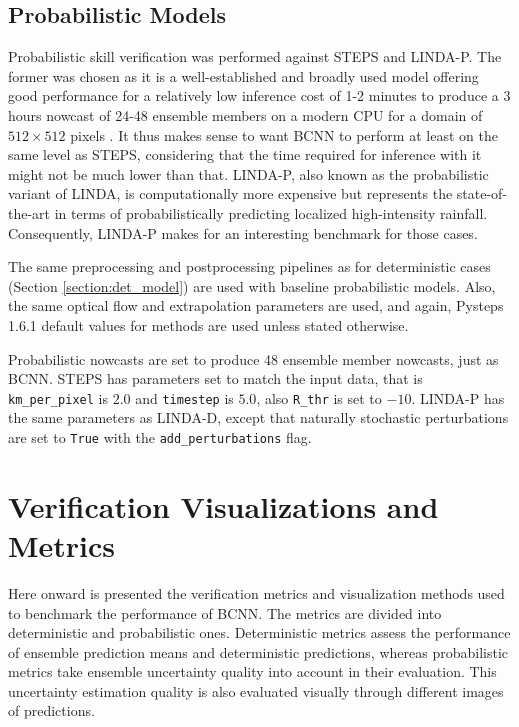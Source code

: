 \subsection{Probabilistic Models}
\label{section:prob_model}

Probabilistic skill verification was performed against STEPS and LINDA-P. The former was chosen as it is a well-established and broadly used model offering good performance for a relatively low inference cost of 1-2 minutes to produce a 3 hours nowcast of 24-48 ensemble members on a modern CPU for a domain of $512 \times 512$ pixels \cite{pulkkinen_pysteps_2019}. It thus makes sense to want BCNN to perform at least on the same level as STEPS, considering that the time required for inference with it might not be much lower than that. LINDA-P, also known as the probabilistic variant of LINDA, is computationally more expensive but represents the state-of-the-art in terms of probabilistically predicting localized high-intensity rainfall. Consequently, LINDA-P makes for an interesting benchmark for those cases. 

The same preprocessing and postprocessing pipelines as for deterministic cases (Section \ref{section:det_model}) are used with baseline probabilistic models. Also, the same optical flow and extrapolation parameters are used, and again, Pysteps 1.6.1 default values for methods are used unless stated otherwise. 

Probabilistic nowcasts are set to produce 48 ensemble member nowcasts, just as BCNN. STEPS has parameters set to match the input data, that is \texttt{km\_per\_pixel} is $2.0$ and \texttt{timestep} is $5.0$, also \texttt{R\_thr} is set to $-10$. LINDA-P has the same parameters as LINDA-D, except that naturally stochastic perturbations are set to \texttt{True} with the \texttt{add\_perturbations} flag.

\section{Verification Visualizations and Metrics}

Here onward is presented the verification metrics and visualization methods used to benchmark the performance of BCNN. The metrics are divided into deterministic and probabilistic ones. Deterministic metrics assess the performance of ensemble prediction means and deterministic predictions, whereas probabilistic metrics take ensemble uncertainty quality into account in their evaluation. This uncertainty estimation quality is also evaluated visually through different images of predictions.

